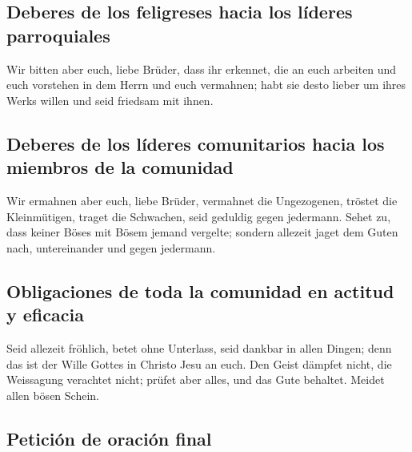 \hypertarget{deberes-de-los-feligreses-hacia-los-luxedderes-parroquiales}{%
\subsection{Deberes de los feligreses hacia los líderes
parroquiales}\label{deberes-de-los-feligreses-hacia-los-luxedderes-parroquiales}}

 Wir bitten aber euch, liebe Brüder, dass ihr erkennet,
die an euch arbeiten und euch vorstehen in dem Herrn und euch vermahnen;
 habt sie desto lieber um ihres Werks willen und seid
friedsam mit ihnen.

\hypertarget{deberes-de-los-luxedderes-comunitarios-hacia-los-miembros-de-la-comunidad}{%
\subsection{Deberes de los líderes comunitarios hacia los miembros de la
comunidad}\label{deberes-de-los-luxedderes-comunitarios-hacia-los-miembros-de-la-comunidad}}

 Wir ermahnen aber euch, liebe Brüder, vermahnet die
Ungezogenen, tröstet die Kleinmütigen, traget die Schwachen, seid
geduldig gegen jedermann.  Sehet zu, dass keiner Böses
mit Bösem jemand vergelte; sondern allezeit jaget dem Guten nach,
untereinander und gegen jedermann.

\hypertarget{obligaciones-de-toda-la-comunidad-en-actitud-y-eficacia}{%
\subsection{Obligaciones de toda la comunidad en actitud y
eficacia}\label{obligaciones-de-toda-la-comunidad-en-actitud-y-eficacia}}

 Seid allezeit fröhlich,  betet ohne
Unterlass,  seid dankbar in allen Dingen; denn das ist
der Wille Gottes in Christo Jesu an euch.  Den Geist
dämpfet nicht,  die Weissagung verachtet nicht;
 prüfet aber alles, und das Gute behaltet.
 Meidet allen bösen Schein.

\hypertarget{peticiuxf3n-de-oraciuxf3n-final}{%
\subsection{Petición de oración
final}\label{peticiuxf3n-de-oraciuxf3n-final}}

